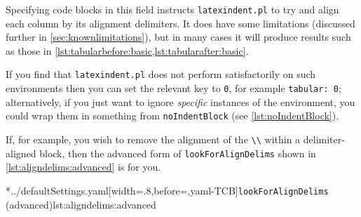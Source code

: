 	Specifying code blocks in this field instructs \texttt{latexindent.pl} to try and align
	each column by its alignment delimiters. It does have some limitations (discussed further
	in \cref{sec:knownlimitations}), but in many cases it will produce results such as those in
	\cref{lst:tabularbefore:basic,lst:tabularafter:basic}.

	If you find that \texttt{latexindent.pl} does not perform satisfactorily on such
	environments then you can set the relevant key to \texttt{0}, for example
	\texttt{tabular: 0}; alternatively, if you just want to ignore
	\emph{specific} instances of the environment, you could wrap them in something
	from \texttt{noIndentBlock} (see \vref{lst:noIndentBlock}).

	\begin{cmhtcbraster}
	\end{cmhtcbraster}

	If, for example, you wish to remove the alignment of the \lstinline!\\! within a
	delimiter-aligned block, then the advanced form of \texttt{lookForAlignDelims} shown in
	\cref{lst:aligndelims:advanced} is for you.

	\cmhlistingsfromfile[style=lookForAlignDelims]*{../defaultSettings.yaml}[width=.8\linewidth,before=\centering,yaml-TCB]{\texttt{lookForAlignDelims} (advanced)}{lst:aligndelims:advanced}

